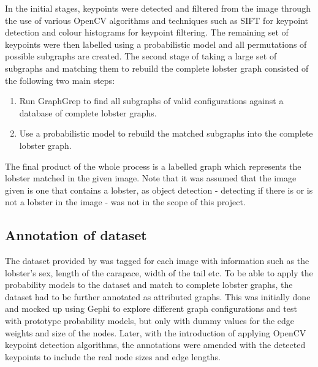 \noindent
In the initial stages, keypoints were detected and filtered from the image through the use of various OpenCV algorithms and techniques such as SIFT for keypoint detection and colour histograms for keypoint filtering. The remaining set of keypoints were then labelled using a probabilistic model and all permutations of possible subgraphs are created. 
\n
The second stage of taking a large set of subgraphs and matching them to rebuild the complete lobster graph consisted of the following two main steps:
\begin{enumerate}
\item Run GraphGrep to find all subgraphs of valid configurations against a database of complete lobster graphs. 
\item Use a probabilistic model to rebuild the matched subgraphs into the complete lobster graph.
\end{enumerate}
The final product of the whole process is a labelled graph which represents the lobster matched in the given image. Note that it was assumed that the image given is one that contains a lobster, as object detection - detecting if there is or is not a lobster in the image - was not in the scope of this project.


\subsection{Annotation of dataset}\label{sec:annotation}
The dataset provided by \cite{lobster-thesis} was tagged for each image with information such as the lobster's sex, length of the carapace, width of the tail etc. To be able to apply the probability models to the dataset and match to complete lobster graphs, the dataset had to be further annotated as attributed graphs. This was initially done and mocked up using Gephi to explore different graph configurations and test with prototype probability models, but only with dummy values for the edge weights and size of the nodes. Later, with the introduction of applying OpenCV keypoint detection algorithms, the annotations were amended with the detected keypoints to include the real node sizes and edge lengths.

